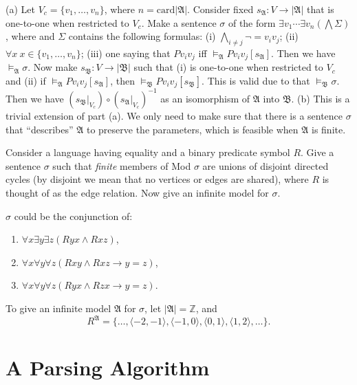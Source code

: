 (a) Let $V_c=\{v_1,\dots,v_n\}$, where $n=\mathrm{card}|\mathfrak{A}|$. Consider fixed $s_{\mathfrak{A}}:V\to|\mathfrak{A}|$ that is one-to-one when restricted to $V_c$.  Make a sentence $\sigma$ of the form $\exists v_1\cdots\exists v_n(\bigwedge \Sigma)$, where  and $\Sigma$ contains the following formulas: (i) $\bigwedge_{i\neq j}\neg =v_iv_j$; (ii) $\forall x\ x\in\{v_1,\dots,v_n\}$; (iii) one saying that $Pv_iv_j$ iff $\vDash_{\mathfrak{A}}Pv_iv_j[s_{\mathfrak{A}}]$. Then we have $\vDash_{\mathfrak{A}}\sigma$. Now make $s_{\mathfrak{B}}:V\to|\mathfrak{B}|$ such that (i) is one-to-one when restricted to $V_c$ and (ii) if $\vDash_{\mathfrak{A}}Pv_iv_j[s_{\mathfrak{A}}]$, then $\vDash_{\mathfrak{B}}Pv_iv_j[s_{\mathfrak{B}}]$. This is valid due to that $\vDash_{\mathfrak{B}}\sigma$. Then we have $(s_{\mathfrak{B}}|_{V_c})\circ(s_{\mathfrak{A}}|_{V_c})^{-1}$ as an isomorphism of $\mathfrak{A}$ into $\mathfrak{B}$.
(b) This is a trivial extension of part (a). We only need to make sure that there is a sentence $\sigma$ that ``describes'' $\mathfrak{A}$ to preserve the parameters, which is feasible when $\mathfrak{A}$ is finite.

\setcounter{exercise}{100}
\begin{exercise}
  Consider a language having equality and a binary predicate symbol $R$. Give a sentence $\sigma$ such that \textit{finite} members of Mod $\sigma$ are unions of disjoint directed cycles (by disjoint we mean that no vertices or edges are shared), where $R$ is thought of as the edge relation. Now give an infinite model for $\sigma$.
\end{exercise}

$\sigma$ could be the conjunction of:
\begin{enumerate}[label=(\alph*)]
  \item $\forall x\exists y\exists z(Ryx\wedge Rxz)$,
  \item $\forall x\forall y\forall z(Rxy\wedge Rxz\to y=z)$,
  \item $\forall x\forall y\forall z(Ryx\wedge Rzx\to y=z)$.
\end{enumerate}

To give an infinite model $\mathfrak{A}$ for $\sigma$, let $|\mathfrak{A}|= \mathbb{Z}$, and
\[
  R^{\mathfrak{A}}=\{\dots,\langle -2,-1\rangle,\langle -1,0\rangle,\langle 0,1\rangle,\langle 1,2\rangle,\dots\}.
\]

\section{A Parsing Algorithm}\label{sec:2.3}

